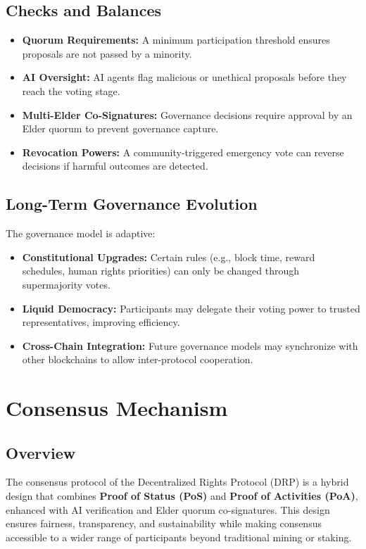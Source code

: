 \documentclass[11pt,a4paper]{article}
\begin{document}
\subsection{Checks and Balances}
\begin{itemize}
    \item \textbf{Quorum Requirements:} A minimum participation threshold ensures proposals are not passed by a minority.
    \item \textbf{AI Oversight:} AI agents flag malicious or unethical proposals before they reach the voting stage.
    \item \textbf{Multi-Elder Co-Signatures:} Governance decisions require approval by an Elder quorum to prevent governance capture.
    \item \textbf{Revocation Powers:} A community-triggered emergency vote can reverse decisions if harmful outcomes are detected.
\end{itemize}

\subsection{Long-Term Governance Evolution}
The governance model is adaptive:
\begin{itemize}
    \item \textbf{Constitutional Upgrades:} Certain rules (e.g., block time, reward schedules, human rights priorities) can only be changed through supermajority votes.
    \item \textbf{Liquid Democracy:} Participants may delegate their voting power to trusted representatives, improving efficiency.
    \item \textbf{Cross-Chain Integration:} Future governance models may synchronize with other blockchains to allow inter-protocol cooperation.
\end{itemize}

\section{Consensus Mechanism}

\subsection{Overview}
The consensus protocol of the Decentralized Rights Protocol (DRP) is a hybrid design that combines \textbf{Proof of Status (PoS\*)} and \textbf{Proof of Activities (PoA\*)}, enhanced with AI verification and Elder quorum co-signatures. 
This design ensures fairness, transparency, and sustainability while making consensus accessible to a wider range of participants beyond traditional mining or staking.
\end{document}
